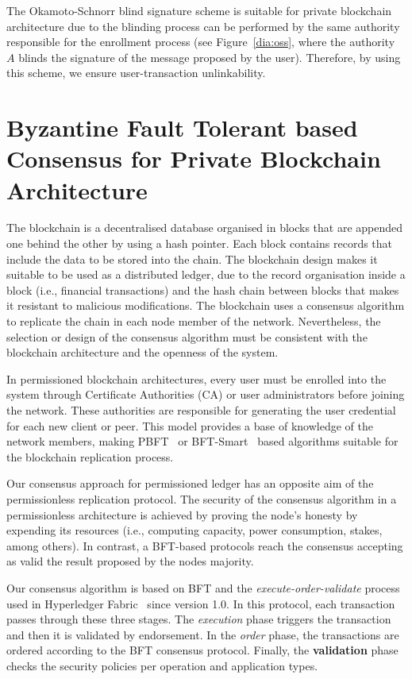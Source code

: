 \documentclass[conference]{llncs}
\begin{document}
The Okamoto-Schnorr blind signature scheme is suitable for private blockchain architecture due to the blinding process can be performed by the same authority responsible for the enrollment process (see Figure~\ref{dia:oss}, where the authority $A$ blinds the signature of the message proposed by the user). Therefore, by using this scheme, we ensure user-transaction unlinkability.

\section{Byzantine Fault Tolerant based Consensus for Private Blockchain Architecture}
\label{PBFTHF}

The blockchain is a decentralised database organised in blocks that are appended one behind the other by using a hash pointer. Each block contains records that include the data to be stored into the chain. The blockchain design makes it suitable to be used as a distributed ledger, due to the record organisation inside a block (i.e., financial transactions) and the hash chain between blocks that makes it resistant to malicious modifications. The blockchain uses a consensus algorithm to replicate the chain in each node member of the network. Nevertheless, the selection or design of the consensus algorithm must be consistent with the blockchain architecture and the openness of the system.

In permissioned blockchain architectures, every user must be enrolled into the system through Certificate Authorities (CA) or user administrators before joining the network. These authorities are responsible for generating the user credential for each new client or peer. This model provides a base of knowledge of the network members, making PBFT~\cite{castro1999practical} or BFT-Smart~\cite{6903593} based algorithms suitable for the blockchain replication process.  

Our consensus approach for permissioned ledger has an opposite aim of the permissionless replication protocol. The security of the consensus algorithm in a permissionless architecture is achieved by proving the node's honesty by expending its resources (i.e., computing capacity, power consumption, stakes, among others). In contrast, a BFT-based protocols reach the consensus accepting as valid the result proposed by the nodes majority. 

Our consensus algorithm is based on BFT and the \textit{execute-order-validate} process used in Hyperledger Fabric~\cite{androulaki2018hyperledger} since version 1.0. In this protocol, each transaction passes through these three stages. The \textit{execution} phase triggers the transaction and then it is validated by endorsement. In the \textit{order} phase, the transactions are ordered according to the BFT consensus protocol. Finally, the \textbf{validation} phase checks the security policies per operation and application types.
\end{document}
